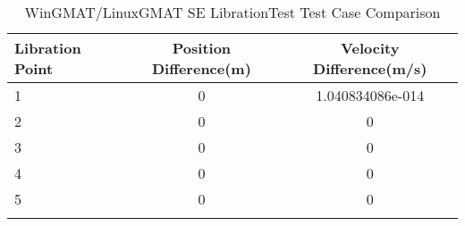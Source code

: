 \begin{table}[htbp!]
\centering
\caption{ WinGMAT/LinuxGMAT SE LibrationTest Test Case Comparison}
      \begin{tabular}{lcc}
      \hline\hline
          Libration Point & Position Difference(m) & Velocity Difference(m/s) \\
         \hline
         1 & 0 & 1.040834086e-014 \\
         2 & 0 & 0 \\
         3 & 0 & 0 \\
         4 & 0 & 0 \\
         5 & 0 & 0 \\
      \hline\hline
      \label{Table: WinGMAT-LinuxGMAT SE LibrationTest Table} 
\end{tabular}
\end{table}
